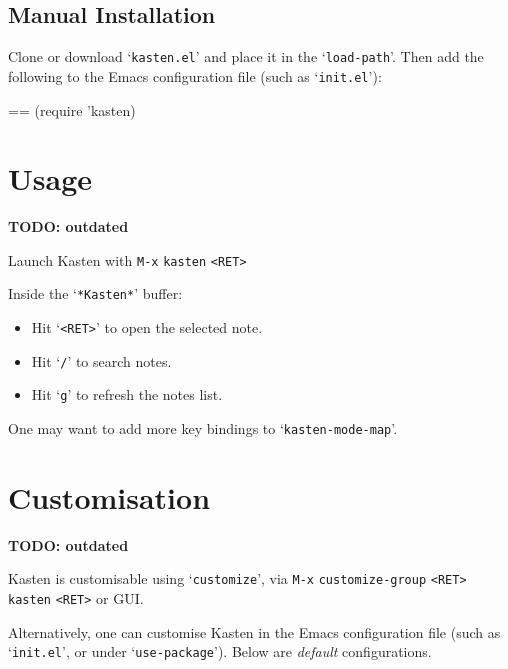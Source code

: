 \documentclass{book}
\makeatletter
\newenvironment{Texinfopreformatted}{%
  \par\GNUTobeylines\obeyspaces\frenchspacing\parskip=\z@\parindent=\z@}{}
{\catcode`\^^M=13 \gdef\GNUTobeylines{\catcode`\^^M=13 \def^^M{\null\par}}}
\newenvironment{Texinfoindented}{\begin{list}{}{}\item\relax}{\end{list}}
\renewcommand{\_}{\Texinfounderscore\discretionary{}{}{}}
\makeatother
\begin{document}
\section{{Manual Installation}}
\label{anchor:Manual-Installation}%

Clone or download `\texttt{kasten.el}' and place it in the `\texttt{load-path}'. Then add the
following to the Emacs configuration file (such as `\texttt{init.el}'):

\begin{Texinfoindented}
\begin{Texinfopreformatted}%
\ttfamily (require 'kasten)
\end{Texinfopreformatted}
\end{Texinfoindented}

\chapter{{Usage}}
\label{anchor:Usage}%

\textbf{TODO: outdated}

Launch Kasten with \texttt{M-x} \texttt{kasten} \texttt{<RET>}

Inside the `\texttt{*Kasten*}' buffer:
\begin{itemize}
\item Hit `\texttt{<RET>}' to open the selected note.
\item Hit `\texttt{/}' to search notes.
\item Hit `\texttt{g}' to refresh the notes list.
\end{itemize}

One may want to add more key bindings to `\texttt{kasten-mode-map}'.

\chapter{{Customisation}}
\label{anchor:Customisation}%

\textbf{TODO: outdated}

Kasten is customisable using `\texttt{customize}', via \texttt{M-x} \texttt{customize-group} \texttt{<RET>}
\texttt{kasten} \texttt{<RET>} or GUI\@.

Alternatively, one can customise Kasten in the Emacs configuration file (such as
`\texttt{init.el}', or under `\texttt{use-package}'). Below are \emph{default} configurations.
\end{document}

